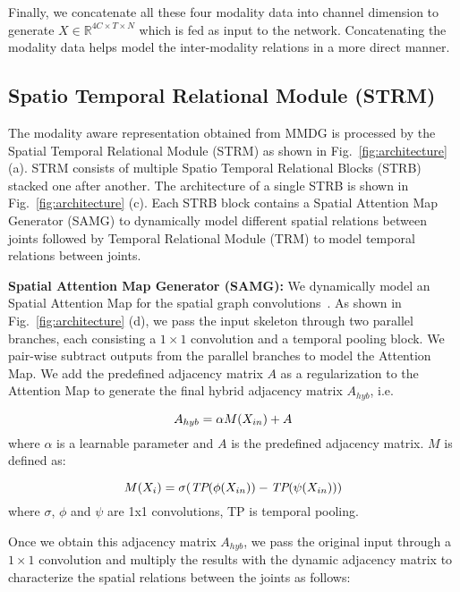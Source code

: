 \documentclass[runningheads]{llncs}
\begin{document}
Finally, we concatenate all these four modality data into channel dimension to generate $X \in \mathbb{R}^{4C \times T \times N}$ which is fed as input to the network. Concatenating the modality data helps model the inter-modality relations in a more direct manner.

\subsection{Spatio Temporal Relational Module (STRM)}
\label{sec:strm}

The modality aware representation obtained from MMDG is processed by the Spatial Temporal Relational Module (STRM) as shown in Fig.~\ref{fig:architecture} (a). STRM consists of multiple Spatio Temporal Relational Blocks (STRB) stacked one after another. The architecture of a single STRB is shown in Fig.~\ref{fig:architecture} (c). Each STRB block contains a Spatial Attention Map Generator (SAMG) to dynamically model different spatial relations between joints followed by Temporal Relational Module (TRM) to model temporal relations between joints. 

\noindent \textbf{Spatial Attention Map Generator (SAMG): } We dynamically model an Spatial Attention Map for the spatial graph convolutions~\cite{chen2021channel,shi2019skeleton}. As shown in  Fig.~\ref{fig:architecture} (d), we pass the input skeleton through two parallel branches, each consisting a $1\times1$ convolution and a temporal pooling block. We  pair-wise subtract outputs from the parallel branches to model the Attention Map. We add the predefined adjacency matrix $A$ as a regularization to the Attention Map to generate the final hybrid adjacency matrix $A_{hyb}$, i.e.

\begin{equation}
\centering
A_{hyb} = \alpha M(X_{in}) + A
\end{equation}
where $\alpha$ is a learnable parameter and $A$ is the predefined adjacency matrix. $M$ is defined as:

\begin{equation}
\centering
M (X_{i}) = \sigma (\textit{TP} (\phi (X_{in})) - \textit{TP} (\psi (X_{in})) )
\end{equation}
where $\sigma$, $\phi$ and $\psi$ are 1x1 convolutions, TP is temporal pooling.

Once we obtain this adjacency matrix $A_{hyb}$, we pass the original input through a $1\times1$ convolution and multiply the results with the dynamic adjacency matrix to characterize the spatial relations between the joints as follows: 
\end{document}
